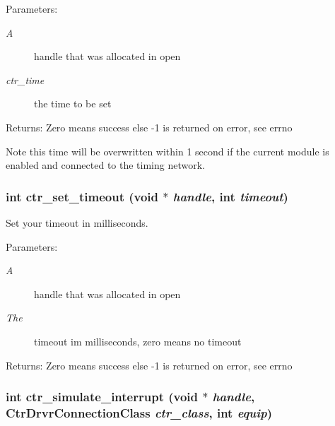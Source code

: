 \begin{Desc}
\item[Parameters:]
\begin{description}
\item[{\em A}]handle that was allocated in open \item[{\em ctr\_\-time}]the time to be set \end{description}
\end{Desc}
\begin{Desc}
\item[Returns:]Zero means success else -1 is returned on error, see errno\end{Desc}
Note this time will be overwritten within 1 second if the current module is enabled and connected to the timing network. 
\subsubsection{\setlength{\rightskip}{0pt plus 5cm}int ctr\_\-set\_\-timeout (void $\ast$ {\em handle}, int {\em timeout})}\label{libctr_8doxygen_60971a629ef7110115d4b1389359b169}


Set your timeout in milliseconds. 

\begin{Desc}
\item[Parameters:]
\begin{description}
\item[{\em A}]handle that was allocated in open \item[{\em The}]timeout im milliseconds, zero means no timeout \end{description}
\end{Desc}
\begin{Desc}
\item[Returns:]Zero means success else -1 is returned on error, see errno \end{Desc}
\subsubsection{\setlength{\rightskip}{0pt plus 5cm}int ctr\_\-simulate\_\-interrupt (void $\ast$ {\em handle}, Ctr\-Drvr\-Connection\-Class {\em ctr\_\-class}, int {\em equip})}\label{libctr_8doxygen_d5959e71509663040db21423f7d1a42c}



